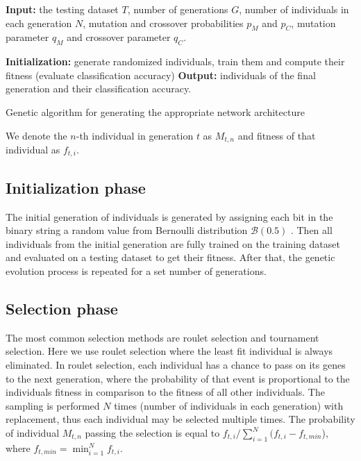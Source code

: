 \documentclass[eng]{simposium}
\begin{document}
\begin{algorithm}[H]
  \SetAlgoLined
  \textbf{Input:} the testing dataset $T$, number of generations $G$, number of individuals in each generation $N$,
  mutation and crossover probabilities $p_M$ and $p_C$, mutation parameter $q_M$ and crossover parameter $q_C$.

  \textbf{Initialization:} generate randomized individuals, train them and compute their fitness (evaluate classification accuracy)\;
   \textbf{Output:} individuals of the final generation and their classification accuracy.
   \caption{Genetic algorithm for generating the appropriate network architecture}
\end{algorithm}


We denote the $n$-th individual in generation $t$ as $M_{t,n}$ and fitness of that individual as $f_{t,i}$.

\subsection{Initialization phase}
The initial generation of individuals is generated by assigning each bit in the binary string a random value from Bernoulli distribution $\mathcal{B}(0.5)$ \cite{4}.
Then all individuals from the initial generation are fully trained on the training dataset and evaluated on a testing dataset to get their fitness.
After that, the genetic evolution process is repeated for a set number of generations.

\subsection{Selection phase}
The most common selection methods are roulet selection and tournament selection. 
Here we use roulet selection where the least fit individual is always eliminated.
In roulet selection, each individual has a chance to pass on its genes to the next generation, 
where the probability of that event is proportional to the individuals fitness in comparison to the fitness of all other individuals.
The sampling is performed $N$ times (number of individuals in each generation) with replacement, thus each individual may be selected multiple times.
The probability of individual $M_{t,n}$ passing the selection is equal to $f_{t,i} / \sum_{i=1}^{N} (f_{t,i} - f_{t,min}$), where $f_{t, min} = \min_{i=1}^{N} {f_{t,i}}$.
\end{document}
